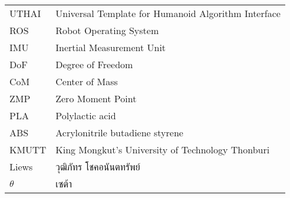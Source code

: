 \begin{abbreviations}
    \noindent
    \begin{tabular*}{\textwidth}{@{}p{}p{}@{}}
        {UTHAI} & {Universal Template for Humanoid Algorithm Interface} \\
        {ROS} & {Robot Operating System} \\
        {IMU} & {Inertial Measurement Unit} \\
        {DoF} & {Degree of Freedom} \\
        {CoM} & {Center of Mass} \\
        {ZMP} & {Zero Moment Point} \\
        {PLA} & {Polylactic acid} \\
        {ABS} & {Acrylonitrile butadiene styrene} \\
        {KMUTT} & {King Mongkut's University of Technology Thonburi} \\
        {Liews} & {วุฒิภัทร โชคอนันตทรัพย์} \\
        {$\theta$} & {เซต้า}
    \end{tabular*}
\end{abbreviations}